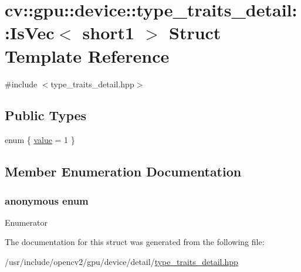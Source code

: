 \hypertarget{structcv_1_1gpu_1_1device_1_1type__traits__detail_1_1IsVec_3_01short1_01_4}{\section{cv\-:\-:gpu\-:\-:device\-:\-:type\-\_\-traits\-\_\-detail\-:\-:Is\-Vec$<$ short1 $>$ Struct Template Reference}
\label{structcv_1_1gpu_1_1device_1_1type__traits__detail_1_1IsVec_3_01short1_01_4}
}


{\ttfamily \#include $<$type\-\_\-traits\-\_\-detail.\-hpp$>$}

\subsection*{Public Types}
\begin{DoxyCompactItemize}
\item 
enum \{ \hyperlink{structcv_1_1gpu_1_1device_1_1type__traits__detail_1_1IsVec_3_01short1_01_4_ab4eaa9ea89e34ca31851ca8fd77481c9a98c75c6692be957704ec379840ac1de8}{value} = 1
 \}
\end{DoxyCompactItemize}


\subsection{Member Enumeration Documentation}
\hypertarget{structcv_1_1gpu_1_1device_1_1type__traits__detail_1_1IsVec_3_01short1_01_4_ab4eaa9ea89e34ca31851ca8fd77481c9}{\subsubsection[{anonymous enum}]{\setlength{\rightskip}{0pt plus 5cm}anonymous enum}}\label{structcv_1_1gpu_1_1device_1_1type__traits__detail_1_1IsVec_3_01short1_01_4_ab4eaa9ea89e34ca31851ca8fd77481c9}
\begin{Desc}
\item[Enumerator]\par
\begin{description}
\item[{\em 
\hypertarget{structcv_1_1gpu_1_1device_1_1type__traits__detail_1_1IsVec_3_01short1_01_4_ab4eaa9ea89e34ca31851ca8fd77481c9a98c75c6692be957704ec379840ac1de8}{value}\label{structcv_1_1gpu_1_1device_1_1type__traits__detail_1_1IsVec_3_01short1_01_4_ab4eaa9ea89e34ca31851ca8fd77481c9a98c75c6692be957704ec379840ac1de8}
}]\end{description}
\end{Desc}


The documentation for this struct was generated from the following file\-:\begin{DoxyCompactItemize}
\item 
/usr/include/opencv2/gpu/device/detail/\hyperlink{type__traits__detail_8hpp}{type\-\_\-traits\-\_\-detail.\-hpp}\end{DoxyCompactItemize}
